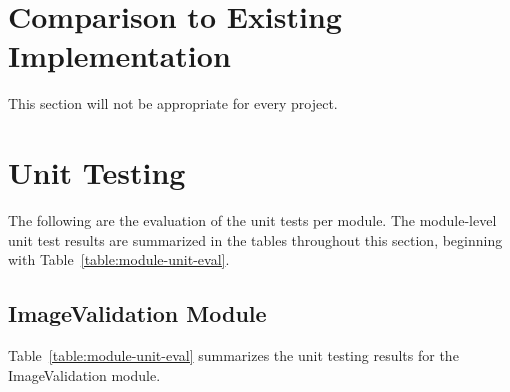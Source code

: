 \documentclass[12pt, titlepage]{article}
\begin{document}
\section{Comparison to Existing Implementation}

This section will not be appropriate for every project.

\section{Unit Testing}
The following are the evaluation of the unit tests per module. The
module-level unit test results are summarized in the tables
throughout this section, beginning with Table~\ref{table:module-unit-eval}.

\subsection{ImageValidation Module}
Table~\ref{table:module-unit-eval} summarizes the unit testing
results for the ImageValidation module.

\newcommand{\monetestcount}{\stepcounter{moduleonetestcase}\themoduleonetestcase}
\end{document}
